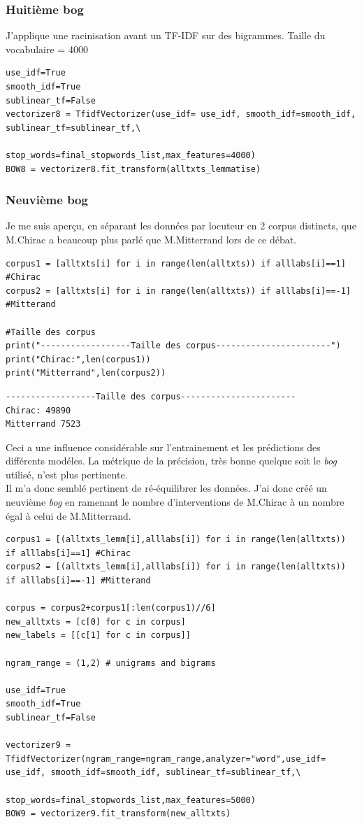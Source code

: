 \documentclass[a4paper,12pt]{article}
\begin{document}
\subsubsection{Huitième bog}
J'applique une racinisation avant un TF-IDF sur des bigrammes. Taille du vocabulaire = 4000
\begin{lstlisting}
use_idf=True
smooth_idf=True
sublinear_tf=False
vectorizer8 = TfidfVectorizer(use_idf= use_idf, smooth_idf=smooth_idf, sublinear_tf=sublinear_tf,\
                            stop_words=final_stopwords_list,max_features=4000)
BOW8 = vectorizer8.fit_transform(alltxts_lemmatise)
\end{lstlisting}

\subsubsection{Neuvième bog}
Je me suis aperçu, en séparant les données par locuteur en 2 corpus distincts, que M.Chirac a beaucoup plus parlé que M.Mitterrand lors de ce débat. 

\begin{lstlisting}
corpus1 = [alltxts[i] for i in range(len(alltxts)) if alllabs[i]==1] #Chirac
corpus2 = [alltxts[i] for i in range(len(alltxts)) if alllabs[i]==-1] #Mitterand

#Taille des corpus
print("------------------Taille des corpus-----------------------")
print("Chirac:",len(corpus1))
print("Mitterrand",len(corpus2))
\end{lstlisting}

\begin{verbatim}
------------------Taille des corpus-----------------------
Chirac: 49890
Mitterrand 7523
\end{verbatim}

Ceci a une influence considérable sur l'entrainement et les prédictions des différents modéles. La métrique de la précision, très bonne quelque soit le \textit{bog} utilisé, n'est plus pertinente. \\ 

Il m'a donc semblé pertinent de ré-équilibrer les données. J'ai donc créé un neuvième \textit{bog} en ramenant le nombre d'interventions de M.Chirac à un nombre égal à celui de M.Mitterrand. 

\begin{lstlisting}
corpus1 = [(alltxts_lemm[i],alllabs[i]) for i in range(len(alltxts)) if alllabs[i]==1] #Chirac
corpus2 = [(alltxts_lemm[i],alllabs[i]) for i in range(len(alltxts)) if alllabs[i]==-1] #Mitterand

corpus = corpus2+corpus1[:len(corpus1)//6]
new_alltxts = [c[0] for c in corpus]
new_labels = [[c[1] for c in corpus]]

ngram_range = (1,2) # unigrams and bigrams

use_idf=True
smooth_idf=True
sublinear_tf=False

vectorizer9 = TfidfVectorizer(ngram_range=ngram_range,analyzer="word",use_idf= use_idf, smooth_idf=smooth_idf, sublinear_tf=sublinear_tf,\
                            stop_words=final_stopwords_list,max_features=5000)
BOW9 = vectorizer9.fit_transform(new_alltxts)
\end{lstlisting}
\end{document}
